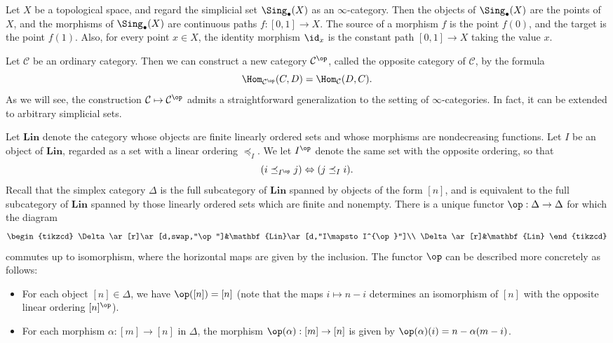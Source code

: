 \begin{example}
Let $X$ be a topological space, and regard the simplicial set $\Sing_\bullet(X)$ as an $\infty$-category. Then the objects of $\Sing_\bullet(X)$ are the points of $X$, and the morphisms of $\Sing_\bullet(X)$ are continuous paths $f:[0,1]\to X$. The source of a morphism $f$ is the point $f(0)$, and the target is the point $f(1)$. Also, for every point $x\in X$, the identity morphism $\id_x$ is the constant path $[0,1]\to X$ taking the value $x$.
\end{example}
Let $\mathcal{C}$ be an ordinary category. Then we can construct a new category $\mathcal{C}^{\op}$, called the opposite category of $\mathcal{C}$, by the formula
\[\Hom_{\mathcal{C}^{\op}}(C,D)=\Hom_{\mathcal{C}}(D,C).\]
As we will see, the construction $\mathcal{C}\mapsto\mathcal{C}^{\op}$ admits a straightforward generalization to the setting of $\infty$-categories. In fact, it can be extended to arbitrary simplicial sets.\par
Let $\mathbf{Lin}$ denote the category whose objects are finite linearly ordered sets and whose morphisms are nondecreasing functions. Let $I$ be an object of $\mathbf{Lin}$, regarded as a set with a linear ordering $\preceq_I$. We let $I^{\op}$ denote the same set with the opposite ordering, so that
\[(i\preceq_{I^{\op}}j)\Leftrightarrow(j\preceq_I i).\]
Recall that the simplex category $\Delta$ is the full subcategory of $\mathbf{Lin}$ spanned by objects of the form $[n]$, and is equivalent to the full subcategory of $\mathbf{Lin}$ spanned by those linearly ordered sets which are finite and nonempty. There is a unique functor $\op:\Delta\to\Delta$ for which the diagram
\[\begin{tikzcd}
\Delta\ar[r]\ar[d,swap,"\op"]&\mathbf{Lin}\ar[d,"I\mapsto I^{\op}"]\\
\Delta\ar[r]&\mathbf{Lin}
\end{tikzcd}\]
commutes up to isomorphism, where the horizontal maps are given by the inclusion. The functor $\op$ can be described more concretely as follows:
\begin{itemize}
\item For each object $[n]\in\Delta$, we have $\op([n])=[n]$ (note that the maps $i\mapsto n-i$ determines an isomorphism of $[n]$ with the opposite linear ordering $[n]^{\op}$).
\item For each morphism $\alpha:[m]\to[n]$ in $\Delta$, the morphism $\op(\alpha):[m]\to[n]$ is given by $\op(\alpha)(i)=n-\alpha(m-i)$.
\end{itemize}

